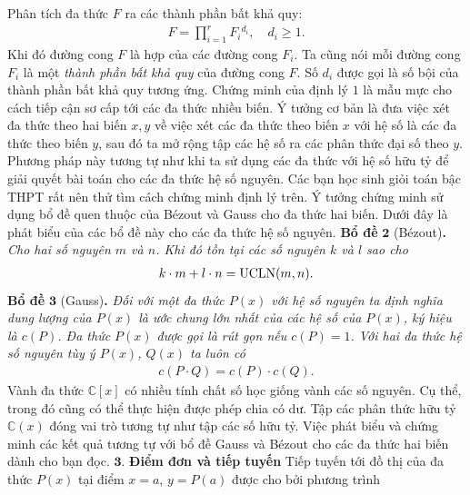 \begin{multicols}{2}
	Phân tích đa thức $F$ ra các thành phần bất khả quy:
	\begin{align*}
		F =\prod_{i=1}^r F_i{}^{d_i},\quad d_i\geq 1.
	\end{align*}
	Khi đó đường cong $F$  là hợp của các đường cong $F_i$. Ta cũng nói mỗi đường cong  $F_i$ là một {\em thành phần bất khả quy} của đường cong  $F$. Số $d_i$ được gọi là số bội của thành phần bất khả quy tương ứng. 
	\vskip 0.1cm
	Chứng minh của định lý $1$ là mẫu mực cho cách tiếp cận sơ cấp tới các đa thức nhiều biến. Ý tưởng cơ bản là đưa việc xét đa thức theo hai biến $x,y$ về việc xét các đa thức theo biến $x$ với hệ số là các đa thức theo biến $y$, sau đó ta mở rộng tập các hệ số ra các phân thức đại số theo $y$. Phương pháp này tương tự như khi ta sử dụng các đa thức với hệ số hữu tỷ để giải quyết bài toán cho các đa thức hệ số nguyên. 
	\vskip 0.1cm
	Các bạn học sinh giỏi toán bậc THPT rất nên thử tìm cách chứng minh định lý trên. Ý tưởng chứng minh sử dụng bổ đề quen thuộc của Bézout và  Gauss cho đa thức hai biến. 
	\vskip 0.1cm
	Dưới đây là phát biểu của các bổ đề này cho các đa thức hệ số nguyên. 
	\vskip 0.1cm
	\textbf{\color{duongvaotoanhoc}Bổ đề} $\pmb{2}$ (Bézout)\textbf{\color{duongvaotoanhoc}.} \textit{Cho hai số nguyên $m$ và $n$. Khi đó tồn tại các số nguyên $k$ và $l$ sao cho }
		\begin{align*}
			k\cdot m+l\cdot n=\textrm{\rm UCLN}(m,n).
		\end{align*}
	\vskip 0.1cm
	\textbf{\color{duongvaotoanhoc}Bổ đề} $\pmb{3}$ (Gauss)\textbf{\color{duongvaotoanhoc}.}
	\textit{Đối với một đa thức $P(x)$ với hệ số nguyên ta định nghĩa {\em  dung lượng} của $P(x)$ là ước chung lớn nhất của các hệ số của $P(x)$, ký hiệu là $c(P)$. Đa thức $P(x)$ được gọi là {\em rút gọn} nếu $c(P)=1$. Với hai đa thức hệ số nguyên tùy ý $P(x)$, $Q(x)$ ta luôn có}
	\begin{align*}
		c(P\cdot Q)=c(P)\cdot c(Q).
	\end{align*}
	Vành đa thức $\mathbb C[x]$ có nhiều tính chất số học giống vành các số nguyên. Cụ thể, trong đó cũng có thể thực hiện được phép chia có dư. Tập các phân thức hữu tỷ $\mathbb C(x)$ đóng vai trò tương tự như tập các số hữu tỷ. 
	Việc phát biểu và chứng minh các kết quả tương tự với bổ đề Gauss và Bézout cho các đa thức hai biến dành cho bạn đọc.  
	\vskip 0.1cm	
	$\pmb{3.}$ \textbf{\color{duongvaotoanhoc}Điểm đơn và tiếp tuyến}
	\vskip 0.1cm
	Tiếp tuyến tới đồ thị của đa thức $P(x)$ tại điểm $x=a$, $y=P(a)$ được cho bởi phương trình
	\begin{align*}

\end{align*}
\end{multicols}
